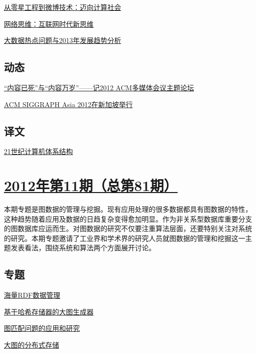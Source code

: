 \documentclass[a4paper]{article}
\begin{document}
\href{http://history.ccf.org.cn/resources/1190201776262/2012/12/17/8.pdf}{从零星工程到微博技术：迈向计算社会}

\href{http://history.ccf.org.cn/resources/1190201776262/2012/12/17/10.pdf}{网络思维：互联网时代新思维}

\href{http://history.ccf.org.cn/resources/1190201776262/2012/12/17/7.pdf}{大数据热点问题与2013年发展趋势分析}

\subsection{动态}
\href{http://history.ccf.org.cn/resources/1190201776262/2012/12/17/13.pdf}{“内容已死”与“内容万岁”——记2012 ACM多媒体会议主题论坛}

\href{http://history.ccf.org.cn/resources/1190201776262/2012/12/17/14.pdf}{ACM SIGGRAPH Asia 2012在新加坡举行}

\subsection{译文}
\href{http://history.ccf.org.cn/resources/1190201776262/2012/12/17/15.pdf}{21世纪计算机体系结构}


\section{\href{http://history.ccf.org.cn/sites/ccf/jsjtbbd.jsp?contentId=2706022159974}{\textbf{2012年第11期（总第81期）}}}
本期专题是图数据的管理与挖掘。现有应用处理的很多数据都具有图数据的特性，这种趋势随着应用及数据的日趋复杂变得愈加明显。作为非关系型数据库重要分支的图数据库应运而生。对图数据的研究不仅要注重算法层面，还要特别关注对系统的研究。本期专题邀请了工业界和学术界的研究人员就图数据的管理和挖掘这一主题发表看法，围绕系统和算法两个方面展开讨论。
\subsection{专题}
\href{http://history.ccf.org.cn/resources/1190201776262/2012/11/16/6.pdf}{海量RDF数据管理}

\href{http://history.ccf.org.cn/resources/1190201776262/2012/11/16/3.pdf}{基于哈希存储器的大图生成器}

\href{http://history.ccf.org.cn/resources/1190201776262/2012/11/16/4.pdf}{图匹配问题的应用和研究}

\href{http://history.ccf.org.cn/resources/1190201776262/2012/11/16/2.pdf}{大图的分布式存储}
\end{document}
